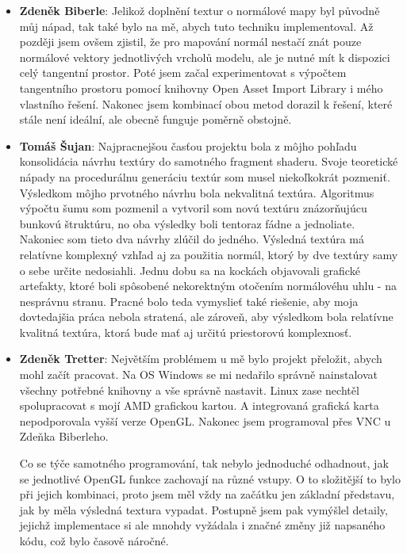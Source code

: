 \documentclass[12pt,a4paper,titlepage,final]{report}
\newcommand\AuthorA{Zdeněk Biberle}
\newcommand\AuthorB{Tomáš Šujan}
\newcommand\AuthorC{Zdeněk Tretter}
\begin{document}
\begin{itemize}
\item \textbf{\AuthorA}: Jelikož doplnění textur o normálové mapy byl původně můj nápad, tak také bylo na mě, abych tuto techniku implementoval. Až později jsem ovšem zjistil, že pro mapování normál nestačí znát pouze normálové vektory jednotlivých vrcholů modelu, ale je nutné mít k dispozici celý tangentní prostor. Poté jsem začal experimentovat s výpočtem tangentního prostoru pomocí knihovny Open Asset Import Library i mého vlastního řešení. Nakonec jsem kombinací obou metod dorazil k řešení, které stále není ideální, ale obecně funguje poměrně obstojně.
\item \textbf{\AuthorB}: Najpracnejšou časťou projektu bola z môjho pohľadu konsolidácia návrhu textúry do samotného fragment shaderu. Svoje teoretické nápady na procedurálnu generáciu textúr som musel niekoľkokrát pozmeniť. Výsledkom môjho prvotného návrhu bola nekvalitná textúra.  Algoritmus výpočtu šumu som pozmenil a vytvoril som novú textúru znázorňujúcu bunkovú štruktúru, no oba výsledky boli tentoraz fádne a jednoliate. Nakoniec som tieto dva návrhy zlúčil do jedného. Výsledná textúra má relatívne komplexný vzhľad aj za použitia normál, ktorý by dve textúry samy o sebe určite nedosiahli. Jednu dobu sa na kockách objavovali grafické artefakty, ktoré boli spôsobené nekorektným otočením normálovéhu uhlu - na nesprávnu stranu. Pracné bolo teda vymyslieť také riešenie, aby moja dovtedajšia práca nebola stratená, ale zároveň, aby výsledkom bola relatívne kvalitná textúra, ktorá bude mať aj určitú priestorovú komplexnosť.
\item \textbf{\AuthorC}: Největším problémem u mě bylo projekt přeložit, abych mohl začít pracovat. Na OS Windows se mi nedařilo správně nainstalovat všechny potřebné knihovny a vše správně nastavit. Linux zase nechtěl spolupracovat s mojí AMD grafickou kartou. A integrovaná grafická karta nepodporovala vyšší verze OpenGL. Nakonec jsem programoval přes VNC u Zdeňka Biberleho. 

Co se týče samotného programování, tak nebylo jednoduché odhadnout, jak se jednotlivé OpenGL funkce zachovají na různé vstupy. O to složitější to bylo při jejich kombinaci, proto jsem měl vždy na začátku jen základní představu, jak by měla výsledná textura vypadat. Postupně jsem pak vymýšlel detaily, jejichž implementace si ale mnohdy vyžádala i značné změny již napsaného kódu, což bylo časově náročné. 

\end{itemize}
\end{document}
